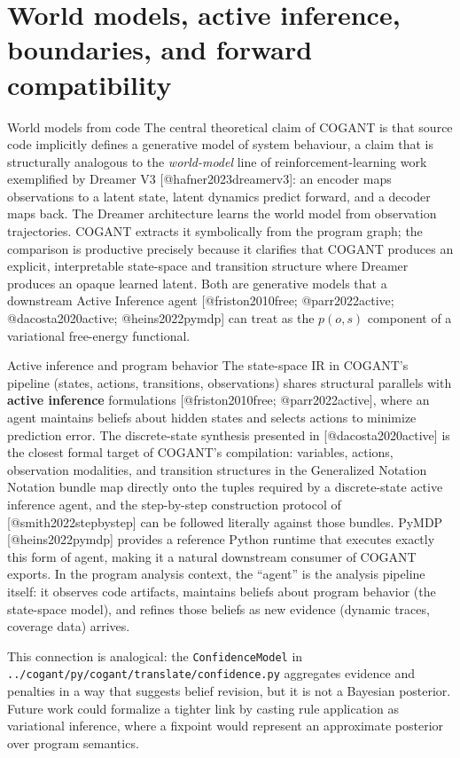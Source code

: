 \documentclass[
  ignorenonframetext,
]{beamer}
\author{\texorpdfstring{}{}}
\date{}
\begin{document}
\section{World models, active inference, boundaries, and forward
compatibility}\label{world-models-active-inference-boundaries-and-forward-compatibility}

\begin{frame}{World models from code}
\protect{}\label{world-models-from-code}
The central theoretical claim of COGANT is that source code implicitly
defines a generative model of system behaviour, a claim that is
structurally analogous to the \emph{world-model} line of
reinforcement-learning work exemplified by Dreamer V3
{[}@hafner2023dreamerv3{]}: an encoder maps observations to a latent
state, latent dynamics predict forward, and a decoder maps back. The
Dreamer architecture learns the world model from observation
trajectories. COGANT extracts it symbolically from the program graph;
the comparison is productive precisely because it clarifies that COGANT
produces an explicit, interpretable state-space and transition structure
where Dreamer produces an opaque learned latent. Both are generative
models that a downstream Active Inference agent {[}@friston2010free;
@parr2022active; @dacosta2020active; @heins2022pymdp{]} can treat as the
\(p(o, s)\) component of a variational free-energy functional.
\end{frame}

\begin{frame}[fragile]{Active inference and program behavior}
\protect{}\label{active-inference-and-program-behavior}
The state-space IR in COGANT's pipeline (states, actions, transitions,
observations) shares structural parallels with \textbf{active inference}
formulations {[}@friston2010free; @parr2022active{]}, where an agent
maintains beliefs about hidden states and selects actions to minimize
prediction error. The discrete-state synthesis presented in
{[}@dacosta2020active{]} is the closest formal target of COGANT's
compilation: variables, actions, observation modalities, and transition
structures in the Generalized Notation Notation bundle map directly onto
the tuples required by a discrete-state active inference agent, and the
step-by-step construction protocol of {[}@smith2022stepbystep{]} can be
followed literally against those bundles. PyMDP {[}@heins2022pymdp{]}
provides a reference Python runtime that executes exactly this form of
agent, making it a natural downstream consumer of COGANT exports. In the
program analysis context, the ``agent'' is the analysis pipeline itself:
it observes code artifacts, maintains beliefs about program behavior
(the state-space model), and refines those beliefs as new evidence
(dynamic traces, coverage data) arrives.

This connection is analogical: the \texttt{ConfidenceModel} in
\texttt{../cogant/py/cogant/translate/confidence.py} aggregates evidence
and penalties in a way that suggests belief revision, but it is not a
Bayesian posterior. Future work could formalize a tighter link by
casting rule application as variational inference, where a fixpoint
would represent an approximate posterior over program semantics.
\end{frame}
\end{document}
